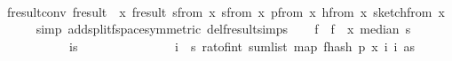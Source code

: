 \begin{isabellebody}
\isanewline
\ \ \isamarkupfalse%
\ f{}{\isacharunderscore}{\kern0pt}result{\isacharunderscore}{\kern0pt}conv{\isacharcolon}{\kern0pt}\ {\isachardoublequoteopen}f{}{\isacharunderscore}{\kern0pt}result\ {\isacharequal}{\kern0pt}\ {\isacharparenleft}{\kern0pt}{\isasymlambda}x{\isachardot}{\kern0pt}\ f{}{\isacharunderscore}{\kern0pt}result\ {\isacharparenleft}{\kern0pt}sfrom\ x{\isacharcomma}{\kern0pt}\ sfrom\ x{\isacharcomma}{\kern0pt}\ p{\isacharunderscore}{\kern0pt}from\ x{\isacharcomma}{\kern0pt}\ h{\isacharunderscore}{\kern0pt}from\ x{\isacharcomma}{\kern0pt}\ sketch{\isacharunderscore}{\kern0pt}from\ x{\isacharparenright}{\kern0pt}{\isacharparenright}{\kern0pt}{\isachardoublequoteclose}\isanewline
\ \ \ \ \isamarkupfalse%
\ {\isacharparenleft}{\kern0pt}simp\ add{\isacharcolon}{\kern0pt}split{\isacharunderscore}{\kern0pt}f{}{\isacharunderscore}{\kern0pt}space{\isacharbrackleft}{\kern0pt}symmetric{\isacharbrackright}{\kern0pt}\ del{\isacharcolon}{\kern0pt}f{}{\isacharunderscore}{\kern0pt}result{\isachardot}{\kern0pt}simps{\isacharparenright}{\kern0pt}\isanewline
\isanewline
\ \ \isamarkupfalse%
\ f\ \ {\isachardoublequoteopen}f\ {\isacharequal}{\kern0pt}\ {\isacharparenleft}{\kern0pt}{\isasymlambda}x{\isachardot}{\kern0pt}\ median\ s\isanewline
\ \ \ \ \ \ \ \ \ \ \ {\isacharparenleft}{\kern0pt}{\isasymlambda}i{\isasymin}{\isacharbraceleft}{\kern0pt}{}{\isachardot}{\kern0pt}{\isachardot}{\kern0pt}{\isacharless}{\kern0pt}s\isanewline
\ \ \ \ \ \ \ \ \ \ \ \ \ \ \ {\isacharparenleft}{\kern0pt}{\isasymSum}i\ {\isacharequal}{\kern0pt}\ {}{\isachardot}{\kern0pt}{\isachardot}{\kern0pt}{\isacharless}{\kern0pt}s\ {\isacharparenleft}{\kern0pt}rat{\isacharunderscore}{\kern0pt}of{\isacharunderscore}{\kern0pt}int\ {\isacharparenleft}{\kern0pt}sum{\isacharunderscore}{\kern0pt}list\ {\isacharparenleft}{\kern0pt}map\ {\isacharparenleft}{\kern0pt}f{}{\isacharunderscore}{\kern0pt}hash\ p\ {\isacharparenleft}{\kern0pt}x\ {\isacharparenleft}{\kern0pt}i\ i{\isacharparenright}{\kern0pt}{\isacharparenright}{\kern0pt}{\isacharparenright}{\kern0pt}\ as{\isacharparenright}{\kern0pt}{\isacharparenright}{\kern0pt}{\isacharparenright}{\kern0pt}\ {\isacharslash}{\kern0pt}\isanewline

\end{isabellebody}
